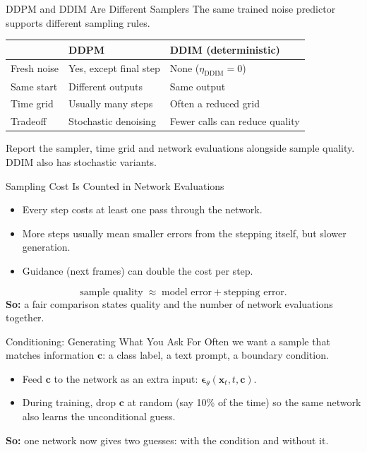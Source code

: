 \documentclass{ntuabeamer}
\begin{document}
\begin{frame}{DDPM and DDIM Are Different Samplers}
  The same trained noise predictor supports different sampling rules.
  \begin{center}
  \begin{tabular}{p{2.0cm}p{3.6cm}p{3.6cm}}
    & DDPM & DDIM (deterministic)\\\hline
    Fresh noise & Yes, except final step & None (\(\eta_{\mathrm{DDIM}}=0\))\\
    Same start & Different outputs & Same output\\
    Time grid & Usually many steps & Often a reduced grid\\
    Tradeoff & Stochastic denoising & Fewer calls can reduce quality\\
  \end{tabular}
  \end{center}
  Report the sampler, time grid and network evaluations alongside sample quality. DDIM also has stochastic variants.
\end{frame}

\begin{frame}{Sampling Cost Is Counted in Network Evaluations}
  \begin{itemize}
    \item Every step costs at least one pass through the network.
    \item More steps usually mean smaller errors from the stepping itself, but slower generation.
    \item Guidance (next frames) can double the cost per step.
  \end{itemize}
  \[
    \text{sample quality}\;\approx\;\text{model error}+\text{stepping error}.
  \]
  \textbf{So:} a fair comparison states quality and the number of network evaluations together.
\end{frame}

\begin{frame}{Conditioning: Generating What You Ask For}
  Often we want a sample that matches information \(\mathbf c\): a class label, a text prompt, a boundary condition.
  \begin{itemize}
    \item Feed \(\mathbf c\) to the network as an extra input: \(\boldsymbol\epsilon_\theta(\mathbf x_t,t,\mathbf c)\).
    \item During training, drop \(\mathbf c\) at random (say 10\% of the time) so the same network also learns the unconditional guess.
  \end{itemize}
  \textbf{So:} one network now gives two guesses: with the condition and without it.
\end{frame}
\end{document}
